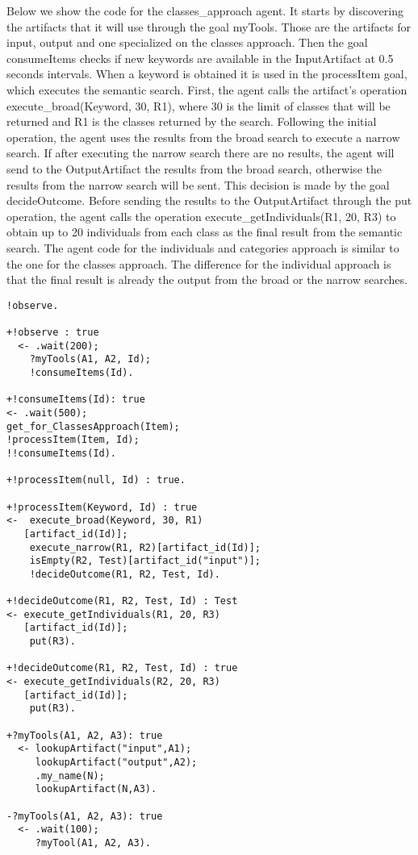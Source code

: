 \documentclass[a4paper,twoside]{article}
\begin{document}
Below we show the code for the classes\_approach agent. It starts by discovering the artifacts that it will use through the goal myTools. Those are the artifacts for input, output and  one specialized on the classes approach. Then the goal consumeItems checks if new keywords are available in the InputArtifact at 0.5 seconds intervals. When a keyword is obtained it is used in the processItem goal, which executes the semantic search. First, the agent calls the artifact's operation execute\_broad(Keyword, 30, R1), where 30 is the limit of classes that will be returned and R1 is the classes returned by the search. Following the initial operation, the agent uses the results from the broad search to execute a narrow search. If after executing the narrow search there are no results, the agent will send to the OutputArtifact the results from the broad search, otherwise the results from the narrow search will be sent. This decision is made by the goal decideOutcome. Before sending the results to the OutputArtifact through the put operation, the agent calls the operation execute\_getIndividuals(R1, 20, R3) to obtain up to 20 individuals from each class as the final result from the semantic search. The agent code for the individuals and categories approach is similar to the one for the classes approach. The difference for the individual approach is that the final result is already the output from the broad or the narrow searches.

\begin{small}
\begin{verbatim}
!observe.

+!observe : true 
  <- .wait(200); 
    ?myTools(A1, A2, Id);
    !consumeItems(Id).

+!consumeItems(Id): true
<- .wait(500);
get_for_ClassesApproach(Item);
!processItem(Item, Id);
!!consumeItems(Id).

+!processItem(null, Id) : true.

+!processItem(Keyword, Id) : true
<-  execute_broad(Keyword, 30, R1)
   [artifact_id(Id)];
	execute_narrow(R1, R2)[artifact_id(Id)];
	isEmpty(R2, Test)[artifact_id("input")];
	!decideOutcome(R1, R2, Test, Id).	

+!decideOutcome(R1, R2, Test, Id) : Test
<- execute_getIndividuals(R1, 20, R3)
   [artifact_id(Id)];
	put(R3).
	
+!decideOutcome(R1, R2, Test, Id) : true
<- execute_getIndividuals(R2, 20, R3)
   [artifact_id(Id)];
	put(R3).
	
+?myTools(A1, A2, A3): true 
  <- lookupArtifact("input",A1);
  	 lookupArtifact("output",A2);
	 .my_name(N);
	 lookupArtifact(N,A3).

-?myTools(A1, A2, A3): true 
  <- .wait(100); 
     ?myTool(A1, A2, A3).
\end{verbatim}
\end{small}
\end{document}
